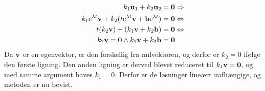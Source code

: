 \begin{bevis}
\begin{equation}
\begin{aligned}
k_1 \mathbf u_1 + k_2 \mathbf u_2 &= \bm{0} \Rightarrow \\
k_1 \mathrm{e}^{\lambda t} \mathbf{v} + k_2 (t \mathrm{e}^{\lambda t} \mathbf{v} + \mathbf{b} \mathrm{e}^{\lambda t}) &= \bm{0} \Leftrightarrow \\
t(k_2 \mathbf{v}) + (k_1 \mathbf{v} + k_2 \mathbf{b}) &= \bm{0} \Leftrightarrow \\
k_2 \mathbf{v} = \bm{0} \wedge k_1 \mathbf{v} + k_2 \mathbf{b} &= \bm{0}
\end{aligned}
\end{equation}
Da $ \mathbf{v} $ er en egenvektor, er den forskellig fra nulvektoren, og derfor er $ k_2 = 0 $ ifølge den første ligning. Den anden ligning er derved blevet reduceret til $ k_1 \mathbf{v} = \bm{0} $, og med samme argument haves $ k_1 = 0 $. Derfor er de løsninger lineært uafhængige, og metoden er nu bevist.
\end{bevis}


